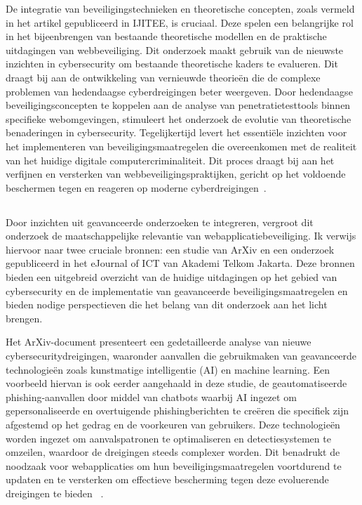 De integratie van beveiligingstechnieken en theoretische concepten, zoals vermeld in het artikel gepubliceerd in IJITEE, is cruciaal. Deze spelen een belangrijke rol 
in het bijeenbrengen van bestaande theoretische modellen en de praktische uitdagingen van webbeveiliging. Dit onderzoek maakt gebruik van de nieuwste inzichten in cybersecurity 
om bestaande theoretische kaders te evalueren. Dit draagt bij aan de ontwikkeling van vernieuwde theorieën die de complexe problemen van hedendaagse 
cyberdreigingen beter weergeven. Door hedendaagse beveiligingsconcepten te koppelen aan de analyse van penetratietesttools binnen specifieke webomgevingen, 
stimuleert het onderzoek de evolutie van theoretische benaderingen in cybersecurity. Tegelijkertijd levert het essentiële inzichten voor het implementeren van beveiligingsmaatregelen
die overeenkomen met de realiteit van het huidige digitale computercriminaliteit.
Dit proces draagt bij aan het verfijnen en versterken van webbeveiligingspraktijken, gericht op het voldoende beschermen tegen en reageren op moderne 
cyberdreigingen~\autocite{Nagendran2019}.

\subsection{}
Door inzichten uit geavanceerde onderzoeken te integreren, vergroot dit onderzoek de maatschappelijke relevantie van webapplicatiebeveiliging. Ik verwijs hiervoor naar 
twee cruciale bronnen: een studie van ArXiv en een onderzoek gepubliceerd in het eJournal of ICT van Akademi Telkom Jakarta. Deze bronnen bieden een uitgebreid overzicht 
van de huidige uitdagingen op het gebied van cybersecurity en de implementatie van geavanceerde beveiligingsmaatregelen en bieden nodige perspectieven die het 
belang van dit onderzoek aan het licht brengen.

Het ArXiv-document presenteert een gedetailleerde analyse van nieuwe cybersecuritydreigingen, waaronder aanvallen die gebruikmaken van geavanceerde technologieën zoals 
kunstmatige intelligentie (AI) en machine learning. Een voorbeeld hiervan is ook eerder aangehaald in deze studie, de geautomatiseerde phishing-aanvallen door middel van chatbots waarbij AI ingezet om 
gepersonaliseerde en overtuigende phishingberichten te creëren die specifiek zijn afgestemd op het gedrag en de voorkeuren van gebruikers. Deze technologieën worden ingezet om 
aanvalspatronen te optimaliseren en detectiesystemen te omzeilen, waardoor de dreigingen steeds complexer worden. Dit benadrukt de noodzaak voor webapplicaties om hun 
beveiligingsmaatregelen voortdurend te updaten en te versterken om effectieve bescherming tegen deze evoluerende dreigingen te bieden ~\autocite{Deng2023}.

